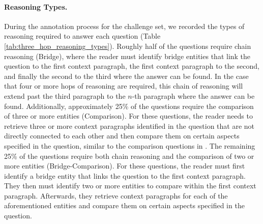 \paragraph{Reasoning Types.}
During the annotation process for the challenge set, we recorded the types of reasoning required to answer each question (Table \ref{tab:three_hop_reasoning_types}). 
Roughly half of the questions require chain reasoning (Bridge), where the reader must identify bridge entities that link the question to the first context paragraph, the first context paragraph to the second, and finally the second to the third where the answer can be found. In the case that four or more hops of reasoning are required, this chain of reasoning will extend past the third paragraph to the $n$-th paragraph where the answer can be found.
Additionally, approximately 25\% of the questions require the comparison of three or more entities (Comparison). 
For these questions, the reader needs to retrieve three or more context paragraphs identified in the question that are not directly connected to each other and then compare them on certain aspects specified in the question, similar to the comparison questions in \hotpotqa{}. 
The remaining 25\% of the questions require both chain reasoning and the comparison of two or more entities (Bridge-Comparison). 
For these questions, the reader must first identify a bridge entity that links the question to the first context paragraph. They then must identify two or more entities to compare within the first context paragraph. 
Afterwards, they retrieve context paragraphs for each of the aforementioned entities and compare them on certain aspects specified in the question.

